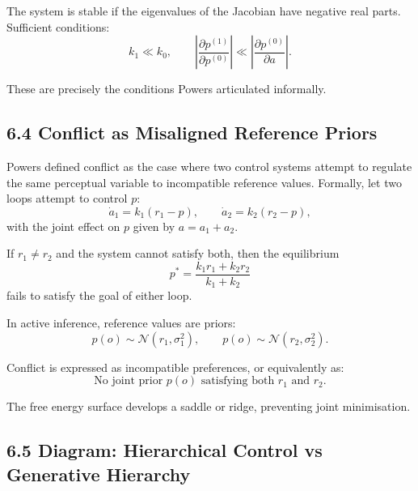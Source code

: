 \documentclass[11pt,a4paper,twoside]{article}
\begin{document}
The system is stable if the eigenvalues of the Jacobian have negative real parts.
Sufficient conditions:
\[
k_1 \ll k_0, \qquad
\left|\frac{\partial p^{(1)}}{\partial p^{(0)}}\right|
\ll
\left|\frac{\partial p^{(0)}}{\partial a}\right|.
\]

These are precisely the conditions Powers articulated informally.

\subsection*{6.4 Conflict as Misaligned Reference Priors}

Powers defined conflict as the case where two control systems attempt to regulate the same perceptual variable to incompatible reference values.
Formally, let two loops attempt to control $p$:
\[
\dot{a}_1 = k_1(r_1 - p), \qquad
\dot{a}_2 = k_2(r_2 - p),
\]
with the joint effect on $p$ given by $a = a_1 + a_2$.

If $r_1 \neq r_2$ and the system cannot satisfy both, then the equilibrium
\[
p^\ast = \frac{k_1 r_1 + k_2 r_2}{k_1 + k_2}
\]
fails to satisfy the goal of either loop.

In active inference, reference values are priors:
\[
p(o) \sim \mathcal{N}(r_1,\sigma_1^2),
\qquad
p(o) \sim \mathcal{N}(r_2,\sigma_2^2).
\]

Conflict is expressed as incompatible preferences,
or equivalently as:
\[
\text{No joint prior } p(o) \text{ satisfying both } r_1 \text{ and } r_2.
\]

The free energy surface develops a saddle or ridge, preventing joint minimisation.

\subsection*{6.5 Diagram: Hierarchical Control vs Generative Hierarchy}

\begin{center}

\end{center}
\end{document}
